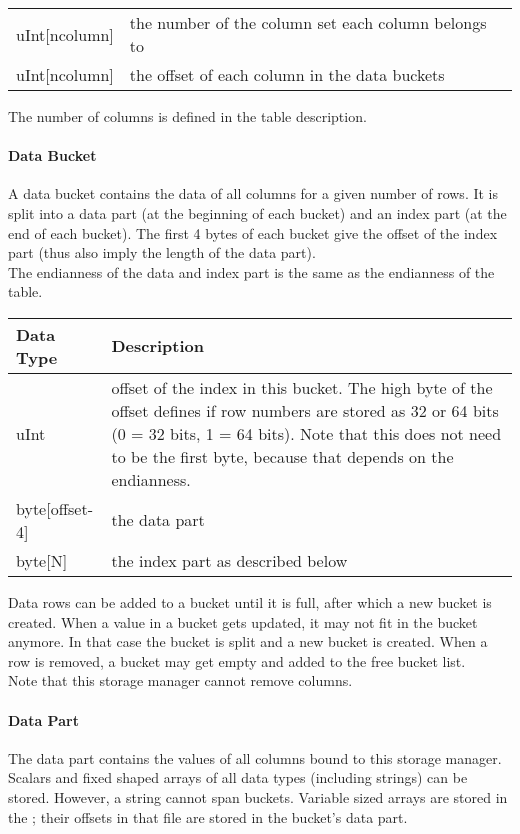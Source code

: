 \vspace{0.15in}
\begin{tabular}{|l|p{13cm}|} \hline
  uInt[ncolumn] & the number of the column set each column belongs to \\
  uInt[ncolumn] & the offset of each column in the data buckets \\
  \hline
\end{tabular}
\vspace{0.15in}
The number of columns is defined in the table description.

\paragraph{Data Bucket\\}
A data bucket contains the data of all columns for a given number of
rows. It is split into a data part (at the beginning of each bucket)
and an index part (at the end of each bucket). The first 4 bytes of
each bucket give the offset of the index part (thus also imply the
length of the data part).
\\The endianness of the data and index part is the same as the
endianness of the table. 

\vspace{0.15in}
\begin{tabular}{|l|p{13cm}|} \hline
  Data Type & Description \\ \hline\hline
  uInt & offset of the index in this bucket. The high byte of the
         offset defines if row numbers are stored as 32 or 64 bits
         (0 = 32 bits, 1 = 64 bits). Note that this does not need to
         be the first byte, because that depends on the endianness.\\
  byte[offset-4] & the data part \\
  byte[N] & the index part as described below \\
  \hline
\end{tabular}
\vspace{0.15in}

Data rows can be added to a bucket until it is full, after which a new
bucket is created. When a value in a bucket gets updated, it may not
fit in the bucket anymore. In that case the bucket is split and a new
bucket is created. When a row is removed, a bucket may get empty and
added to the free bucket list.
\\Note that this storage manager cannot remove columns.

\paragraph{Data Part\\}
The data part contains the values of all columns bound to this storage
manager. Scalars and fixed shaped arrays of all data types (including
strings) can be stored. However, a string cannot span buckets. 
Variable sized arrays are stored in the
; their offsets in that file are
stored in the bucket's data part. 

